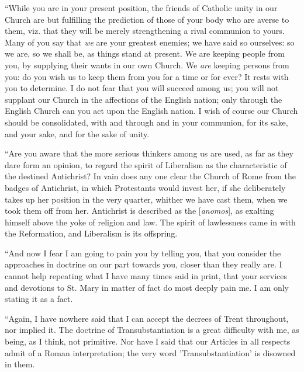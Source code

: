 ``While you are in your present position, the friends of Catholic
unity in our Church are but fulfilling the prediction of those of your
body who are averse to them, viz. that they will be merely strengthening
a rival communion to yours. Many of you say that \emph{we} are your
greatest enemies; we have said so ourselves: so we are, so we shall be,
as things stand at present. We are keeping people from you, by supplying
their wants in our own Church. We \emph{are} keeping persons from you:
do you wish us to keep them from you for a time or for ever? It rests
with you to determine. I do not fear that you will succeed among us; you
will not supplant our Church in the affections of the English nation;
only through the English Church can you act upon the English nation. I
wish of course our Church should be consolidated, with and through and
in your communion, for its sake, and your sake, and for the sake of
unity.

``Are you aware that the more serious thinkers among us are used,
as far as they dare form an opinion, to regard the spirit of Liberalism
as the characteristic of the destined Antichrist? In vain does any one
clear the Church of Rome from the badges of Antichrist, in which
Protestants would invest her, if she deliberately takes up her position
in the very quarter, whither we have cast them, when we took them off
from her. Antichrist is described as the [\emph{anomos}],
as exalting himself above the yoke of religion and law. The spirit of
lawlessness came in with the Reformation, and Liberalism is its
offspring.

``And now I fear I am going to pain you by telling you, that you
consider the approaches in doctrine on our part towards you, closer than
they really are. I cannot help repeating what I have many times said in
print, that your services and devotions to St. Mary in matter of fact do
most deeply pain me. I am only stating it as a fact.

``Again, I have nowhere said that I can accept the decrees of
Trent throughout, nor implied it. The doctrine of Transubstantiation is
a great difficulty with me, as being, as I think, not primitive. Nor
have I said that our Articles in all respects admit of a Roman
interpretation; the very word 'Transubstantiation' is disowned in them.

